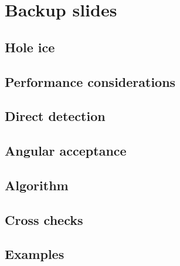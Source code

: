 \documentclass[green, 12pt]{beamer}
\begin{document}
  

\appendix
\section{Backup slides}

\subsection{Hole ice}
  

\subsection{Performance considerations}
  
  
  

\subsection{Direct detection}
  

\subsection{Angular acceptance}
  
  

\subsection{Algorithm}
  

\subsection{Cross checks}
  
  
  
  

\subsection{Examples}
  
  
  
  
  
  
  
  
  
\end{document}
